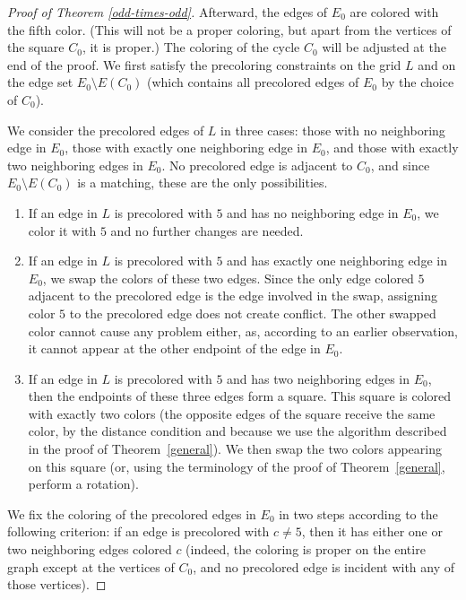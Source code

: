 \documentclass[a4paper,12pt]{article}
\begin{document}
\begin{proof}[Proof of Theorem \ref{odd-times-odd}]
    Afterward, the edges of $E_0$ are colored with the fifth color. (This will not be a proper coloring, but apart from the vertices of the square $C_0$, it is proper.) The coloring of the cycle $C_0$ will be adjusted at the end of the proof. We first satisfy the precoloring constraints on the grid $L$ and on the edge set $E_0 \setminus E(C_0)$ (which contains all precolored edges of $E_0$ by the choice of $C_0$).

    We consider the precolored edges of $L$ in three cases: those with no neighboring edge in $E_0$, those with exactly one neighboring edge in $E_0$, and those with exactly two neighboring edges in $E_0$. No precolored edge is adjacent to $C_0$, and since $E_0 \setminus E(C_0)$ is a matching, these are the only possibilities.

    \begin{enumerate}
        \item If an edge in $L$ is precolored with $5$ and has no neighboring edge in $E_0$, we color it with $5$ and no further changes are needed.
        \item If an edge in $L$ is precolored with $5$ and has exactly one neighboring edge in $E_0$, we swap the colors of these two edges. Since the only edge colored $5$ adjacent to the precolored edge is the edge involved in the swap, assigning color $5$ to the precolored edge does not create conflict. The other swapped color cannot cause any problem either, as, according to an earlier observation, it cannot appear at the other endpoint of the edge in $E_0$.
        \item If an edge in $L$ is precolored with $5$ and has two neighboring edges in $E_0$, then the endpoints of these three edges form a square. This square is colored with exactly two colors (the opposite edges of the square receive the same color, by the distance condition and because we use the algorithm described in the proof of Theorem~\ref{general}). We then swap the two colors appearing on this square (or, using the terminology of the proof of Theorem~\ref{general}, perform a rotation).
    \end{enumerate}

    We fix the coloring of the precolored edges in $E_0$ in two steps according to the following criterion: if an edge is precolored with $c \neq 5$, then it has either one or two neighboring edges colored $c$ (indeed, the coloring is proper on the entire graph except at the vertices of $C_0$, and no precolored edge is incident with any of those vertices).


\end{proof}
\end{document}

